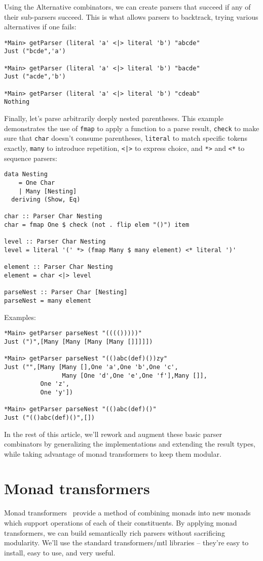 \documentclass{tmr}
\begin{document}
Using the Alternative combinators, we can create parsers that succeed if any of
their sub-parsers succeed.  This is what allows parsers to backtrack, trying
various alternatives if one fails:
\begin{verbatim}
*Main> getParser (literal 'a' <|> literal 'b') "abcde"
Just ("bcde",'a')

*Main> getParser (literal 'a' <|> literal 'b') "bacde"
Just ("acde",'b')

*Main> getParser (literal 'a' <|> literal 'b') "cdeab"
Nothing
\end{verbatim}
Finally, let's parse arbitrarily deeply nested parentheses.  This example 
demonstrates the use of \verb+fmap+ to apply a function to a parse result, 
\verb+check+ to make sure that \verb+char+ doesn't consume parentheses,
\verb+literal+ to match specific tokens exactly, \verb+many+ to introduce
repetition, \verb+<|>+ to express choice, and \verb+*>+ 
and \verb+<*+ to sequence parsers:
\begin{verbatim}
data Nesting
    = One Char
    | Many [Nesting]
  deriving (Show, Eq)
  
char :: Parser Char Nesting
char = fmap One $ check (not . flip elem "()") item

level :: Parser Char Nesting
level = literal '(' *> (fmap Many $ many element) <* literal ')'

element :: Parser Char Nesting
element = char <|> level

parseNest :: Parser Char [Nesting]
parseNest = many element
\end{verbatim}
Examples:
\begin{verbatim}
*Main> getParser parseNest "(((()))))"
Just (")",[Many [Many [Many [Many []]]]])

*Main> getParser parseNest "(()abc(def)())zy"
Just ("",[Many [Many [],One 'a',One 'b',One 'c',
                Many [One 'd',One 'e',One 'f'],Many []],
          One 'z',
          One 'y'])

*Main> getParser parseNest "(()abc(def)()"
Just ("(()abc(def)()",[])
\end{verbatim}
In the rest of this article, we'll rework and augment these basic parser 
combinators by generalizing the implementations and extending the result types,
while taking advantage of monad transformers to keep them modular.




\section{Monad transformers}
Monad transformers~\cite{liang} provide a method of combining monads into
new monads which support operations of each of their constituents.  
By applying monad transformers, we can build semantically rich parsers without sacrificing modularity.
We'll use the standard transformers/mtl \cite{mtl} libraries -- 
they're easy to install, easy to use, and very useful.
\end{document}
